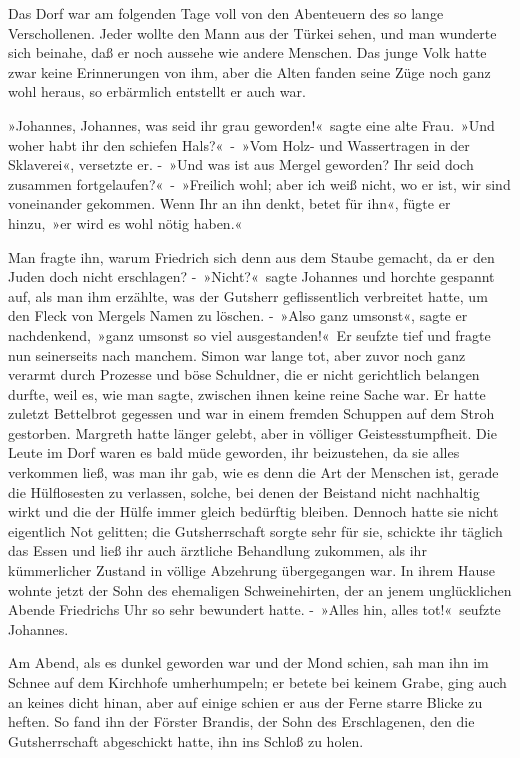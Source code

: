 Das Dorf war am folgenden Tage voll von den Abenteuern des so lange Verschollenen. Jeder wollte den Mann aus der Türkei sehen, und man wunderte sich beinahe, daß er noch aussehe wie andere Menschen. Das junge Volk hatte zwar keine Erinnerungen von ihm, aber die Alten fanden seine Züge noch ganz wohl heraus, so erbärmlich entstellt er auch war.

»Johannes, Johannes, was seid ihr grau geworden!« sagte eine alte Frau. »Und woher habt ihr den schiefen Hals?« - »Vom Holz- und Wassertragen in der Sklaverei«, versetzte er. - »Und was ist aus Mergel geworden? Ihr seid doch zusammen fortgelaufen?« - »Freilich wohl; aber ich weiß nicht, wo er ist, wir sind voneinander gekommen. Wenn Ihr an ihn denkt, betet für ihn«, fügte er hinzu, »er wird es wohl nötig haben.«

Man fragte ihn, warum Friedrich sich denn aus dem Staube gemacht, da er den Juden doch nicht erschlagen? - »Nicht?« sagte Johannes und horchte gespannt auf, als man ihm erzählte, was der Gutsherr geflissentlich verbreitet hatte, um den Fleck von Mergels Namen zu löschen. - »Also ganz umsonst«, sagte er nachdenkend, »ganz umsonst so viel ausgestanden!« Er seufzte tief und fragte nun seinerseits nach manchem. Simon war lange tot, aber zuvor noch ganz verarmt durch Prozesse und böse Schuldner, die er nicht gerichtlich belangen durfte, weil es, wie man sagte, zwischen ihnen keine reine Sache war. Er hatte zuletzt Bettelbrot gegessen und war in einem fremden Schuppen auf dem Stroh gestorben. Margreth hatte länger gelebt, aber in völliger Geistesstumpfheit. Die Leute im Dorf waren es bald müde geworden, ihr beizustehen, da sie alles verkommen ließ, was man ihr gab, wie es denn die Art der Menschen ist, gerade die Hülflosesten zu verlassen, solche, bei denen der Beistand nicht nachhaltig wirkt und die der Hülfe immer gleich bedürftig bleiben. Dennoch hatte sie nicht eigentlich Not gelitten; die Gutsherrschaft sorgte sehr für sie, schickte ihr täglich das Essen und ließ ihr auch ärztliche Behandlung zukommen, als ihr kümmerlicher Zustand in völlige Abzehrung übergegangen war. In ihrem Hause wohnte jetzt der Sohn des ehemaligen Schweinehirten, der an jenem unglücklichen Abende Friedrichs Uhr so sehr bewundert hatte. - »Alles hin, alles tot!« seufzte Johannes.

Am Abend, als es dunkel geworden war und der Mond schien, sah man ihn im Schnee auf dem Kirchhofe umherhumpeln; er betete bei keinem Grabe, ging auch an keines dicht hinan, aber auf einige schien er aus der Ferne starre Blicke zu heften. So fand ihn der Förster Brandis, der Sohn des Erschlagenen, den die Gutsherrschaft abgeschickt hatte, ihn ins Schloß zu holen.

